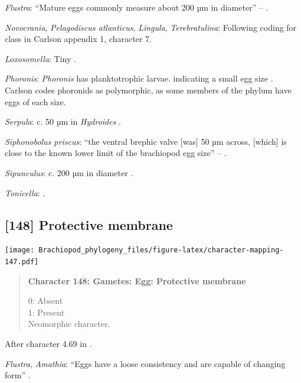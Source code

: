 \documentclass[openany]{book}
\begin{document}
\hypertarget{Flustra-coding-147}{}
\emph{Flustra}: ``Mature eggs commonly measure about 200 µm in
diameter'' -- \citet{Franzen1977}.

\hypertarget{Lingula-coding-147}{}
\emph{Novocrania}, \emph{Pelagodiscus atlanticus}, \emph{Lingula},
\emph{Terebratulina}: Following coding for class in Carlson
\citeyearpar{Carlson1995Phylogeneticrelationships} appendix 1, character
7.

\hypertarget{Loxosomella-coding-147}{}
\emph{Loxosomella}: Tiny \citep{Nielsen1966}.

\hypertarget{Phoronis-coding-147}{}
\emph{Phoronis}: \emph{Phoronis} has planktotrophic larvae. indicating a
small egg size \citep{Ruppert2004Invertebratezoology}. Carlson
\citeyearpar{Carlson1995Phylogeneticrelationships} codes phoronids as
polymorphic, as some members of the phylum have eggs of each size.

\hypertarget{Serpula-coding-147}{}
\emph{Serpula}: c. 50 µm in \emph{Hydroides} \citep{Miles2007}.

\hypertarget{Siphonobolus_priscus-coding-147}{}
\emph{Siphonobolus priscus}: ``the ventral brephic valve {[}was{]} 50 µm
across, {[}which{]} is close to the known lower limit of the brachiopod
egg size'' -- \citet{Popov2009Earlyontogeny}.

\hypertarget{Sipunculus-coding-147}{}
\emph{Sipunculus}: c. 200 µm in diameter \citep{Rice1988}.

\hypertarget{Tonicella-coding-147}{}
\emph{Tonicella}: \citet{BucklandNicks1988}.

\subsection*{{[}148{]} Protective membrane}\label{protective-membrane}

\texttt{[image: Brachiopod\_phylogeny\_files/figure-latex/character-mapping-147.pdf]}

\begin{quote}
\textbf{Character 148: Gametes: Egg: Protective membrane}

0: Absent\\
1: Present\\
Neomorphic character.
\end{quote}

After character 4.69 in \citet{SPS1996}.

\hypertarget{Amathia-coding-148}{}
\emph{Flustra}, \emph{Amathia}: ``Eggs have a loose consistency and are
capable of changing form'' \citep{Franzen1977}.
\end{document}
